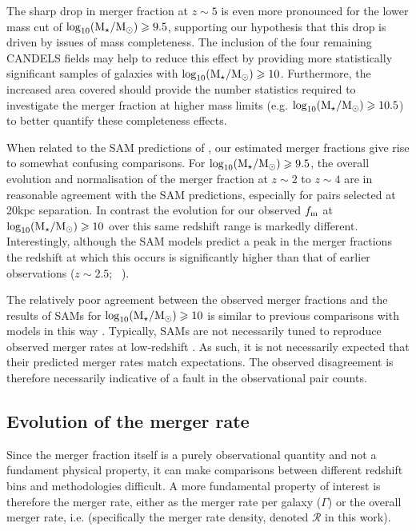 The sharp drop in merger fraction at $z\sim5$ is even more pronounced for the lower mass cut of $\log_{10}(\text{M}_{\star} / \text{M}_{\odot}) \geqslant 9.5$, supporting our hypothesis that this drop is driven by issues of mass completeness. The inclusion of the four remaining CANDELS fields may help to reduce this effect by providing more statistically significant samples of galaxies with $\log_{10}(\text{M}_{\star} / \text{M}_{\odot}) \geqslant 10$. Furthermore, the increased area covered should provide the number statistics required to investigate the merger fraction at higher mass limits (e.g. $\log_{10}(\text{M}_{\star} / \text{M}_{\odot}) \geqslant 10.5$) to better quantify these completeness effects. 

When related to the SAM predictions of \citet{Lu:2011hj}, our estimated merger fractions give rise to somewhat confusing comparisons. For $\log_{10}(\text{M}_{\star} / \text{M}_{\odot}) \geqslant 9.5$, the overall evolution and normalisation of the merger fraction at $z\sim2$ to $z\sim4$ are in reasonable agreement with the SAM predictions, especially for pairs selected at 20kpc separation. In contrast the evolution for our observed $f_{\rm{m}}$ at $\log_{10}(\text{M}_{\star} / \text{M}_{\odot}) \geqslant 10$ over this same redshift range is markedly different. Interestingly, although the SAM models predict a peak in the merger fractions the redshift at which this occurs is significantly higher than that of earlier observations ($z\sim2.5$; \citeauthor{Conselice:2014ct}~\citeyear{Conselice:2014ct}).

The relatively poor agreement between the observed merger fractions and the results of SAMs for $\log_{10}(\text{M}_{\star} / \text{M}_{\odot}) \geqslant 10$ is similar to previous comparisons with models in this way \citep{Bertone:2009jc,Jogee:2009iz}. Typically, SAMs are not necessarily tuned to reproduce observed merger rates at low-redshift \citep{Lu:2014kl}.  As such, it is not necessarily expected that their predicted merger rates match expectations. The observed disagreement is therefore necessarily indicative of a fault in the observational pair counts.

\subsection{Evolution of the merger rate}\label{sec:mergerrate}
Since the merger fraction itself is a purely observational quantity and not a fundament physical property, it can make comparisons between different redshift bins and methodologies difficult. A more fundamental property of interest is therefore the merger rate, either as the merger rate per galaxy ($\Gamma$) or the overall merger rate, i.e. (specifically the merger rate density, denoted $\mathcal{R}$ in this work).

